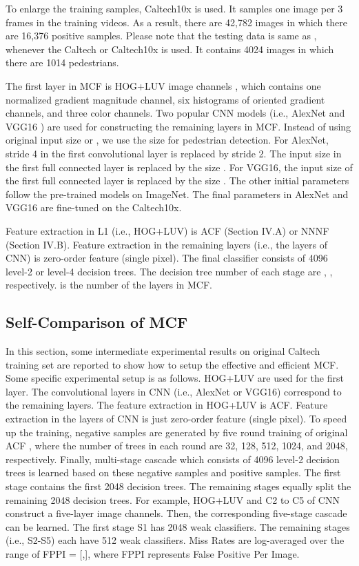 \documentclass[journal]{IEEEtran}
\begin{document}
To enlarge the training samples, Caltech10x is used. It samples one image per 3 frames in the training videos. As a result, there are 42,782 images in which there are 16,376 positive samples. Please note that the testing data is same as \cite{Dollar_PD_CVPR_2009}, \cite{Dollar_PD_PAMI_2010} whenever the Caltech or Caltech10x is used. It contains 4024 images in which there are 1014 pedestrians.

The first layer in MCF is HOG+LUV image channels \cite{Dollar_ICF_BMVC_2009}, which contains one normalized gradient magnitude channel, six histograms of oriented gradient channels, and three color channels. Two popular CNN models (i.e., AlexNet \cite{Krizhevsky_AlexNet_NIPS_2012} and VGG16 \cite{Simonyan_VGG_arXiv_2015}) are used for constructing the remaining layers in MCF. Instead of using original input size  or , we use the size  for pedestrian detection. For AlexNet, stride 4 in the first convolutional layer is replaced by stride 2. The input size  in the first full connected layer is replaced by the size . For VGG16, the input size  of the first full connected layer is replaced by the size . The other initial parameters follow the pre-trained models on ImageNet. The final parameters in AlexNet and VGG16 are fine-tuned on the Caltech10x.

Feature extraction in L1 (i.e., HOG+LUV) is ACF \cite{Dollar_ACF_PAMI_2014} (Section IV.A) or NNNF \cite{Cao_NNNF_arXiv_2015} (Section IV.B). Feature extraction in the remaining layers (i.e., the layers of CNN) is zero-order feature (single pixel). The final classifier consists of 4096 level-2 or level-4 decision trees. The decision tree number of each stage are , , respectively.  is the number of the layers in MCF.

\subsection{Self-Comparison of MCF}
In this section, some intermediate experimental results on original Caltech training set are reported to show how to setup the effective and efficient MCF. Some specific experimental setup is as follows. HOG+LUV are used for the first layer. The convolutional layers in CNN (i.e., AlexNet or VGG16) correspond to the remaining layers. The feature extraction in HOG+LUV is ACF. Feature extraction in the layers of CNN is just zero-order feature (single pixel). To speed up the training, negative samples are generated by five round training of original ACF \cite{Dollar_ACF_PAMI_2014}, where the number of trees in each round are 32, 128, 512, 1024, and 2048, respectively. Finally, multi-stage cascade which consists of 4096 level-2 decision trees is learned based on these negative samples and positive samples. The first stage contains the first 2048 decision trees. The remaining stages equally split the remaining 2048 decision trees. For example, HOG+LUV and C2 to C5 of CNN construct a five-layer image channels. Then, the corresponding five-stage cascade can be learned. The first stage S1 has 2048 weak classifiers. The remaining stages (i.e., S2-S5) each have 512 weak classifiers. Miss Rates are log-averaged over the range of FPPI = [,], where FPPI represents False Positive Per Image. 
\end{document}
